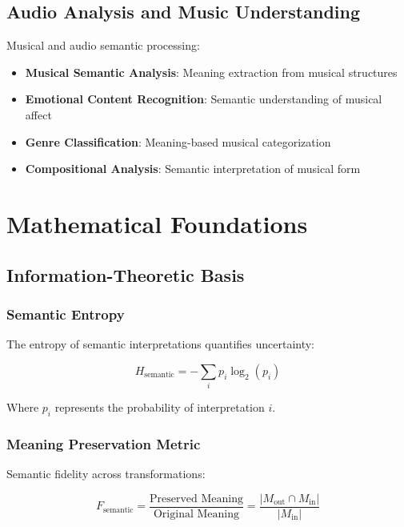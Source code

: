 \documentclass[12pt,a4paper,twoside]{article}
\begin{document}
\subsection{Audio Analysis and Music Understanding}

Musical and audio semantic processing:

\begin{itemize}
\item \textbf{Musical Semantic Analysis}: Meaning extraction from musical structures
\item \textbf{Emotional Content Recognition}: Semantic understanding of musical affect
\item \textbf{Genre Classification}: Meaning-based musical categorization
\item \textbf{Compositional Analysis}: Semantic interpretation of musical form
\end{itemize}

\section{Mathematical Foundations}

\subsection{Information-Theoretic Basis}

\subsubsection{Semantic Entropy}

The entropy of semantic interpretations quantifies uncertainty:

\begin{equation}
H_{\text{semantic}} = -\sum_{i} p_i \log_2(p_i)
\end{equation}

Where $p_i$ represents the probability of interpretation $i$.

\subsubsection{Meaning Preservation Metric}

Semantic fidelity across transformations:

\begin{equation}
F_{\text{semantic}} = \frac{\text{Preserved Meaning}}{\text{Original Meaning}} = \frac{|M_{\text{out}} \cap M_{\text{in}}|}{|M_{\text{in}}|}
\end{equation}
\end{document}
